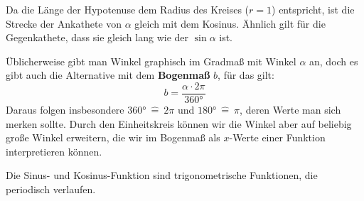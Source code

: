 \documentclass[ngerman, 12pt]{nssheetxea}
\begin{document}
Da die Länge der Hypotenuse dem Radius des Kreises ($r=1$) entspricht, ist die Strecke der Ankathete von $\alpha$ gleich mit dem Kosinus. Ähnlich gilt für die Gegenkathete, dass sie gleich lang wie der $\sin \alpha$ ist. \par
Üblicherweise gibt man Winkel graphisch im Gradmaß mit Winkel $\alpha$ an, doch es gibt auch die Alternative mit dem \textbf{Bogenmaß} $b$, für das gilt:
\[ b = \dfrac{\alpha \cdot 2 \pi}{ \ang{360}}\]
Daraus folgen insbesondere $\ang{360} \ \hat{=} \ 2\pi$ und $\ang{180} \ \hat{=} \ \pi$, deren Werte man sich merken sollte. Durch den Einheitskreis können wir die Winkel aber auf beliebig große Winkel erweitern, die wir im Bogenmaß als $x$-Werte einer Funktion interpretieren können.

\begin{definition}
Die Sinus- und Kosinus-Funktion sind trigonometrische Funktionen, die periodisch verlaufen.
  
\begin{center}
\end{center}

\end{definition}
\end{document}
